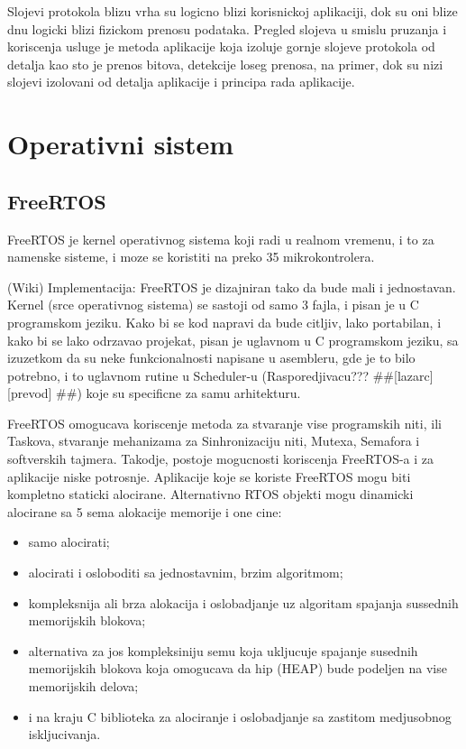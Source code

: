 \documentclass[a4paper,12pt, master]{etf}
\begin{document}
	Slojevi protokola blizu vrha su logicno blizi korisnickoj aplikaciji, dok su oni blize dnu 
	logicki blizi fizickom prenosu podataka. Pregled slojeva u smislu pruzanja i koriscenja 
	usluge je metoda aplikacije koja izoluje gornje slojeve protokola od detalja kao sto je 
	prenos bitova, detekcije loseg prenosa, na primer, dok su nizi slojevi izolovani od detalja 
	aplikacije i principa rada aplikacije.

	
	\newpage

	\chapter{Operativni sistem}

	\section{FreeRTOS}

	FreeRTOS je kernel operativnog sistema koji radi u realnom vremenu, i to za namenske 
	sisteme, i moze se koristiti na preko 35 mikrokontrolera.

	(Wiki) Implementacija:
	FreeRTOS je dizajniran tako da bude mali i jednostavan. Kernel (srce operativnog sistema) 
	se sastoji od samo 3 fajla, i pisan je u C programskom jeziku. Kako bi se kod napravi da 
	bude citljiv, lako portabilan, i kako bi se lako odrzavao projekat, pisan je uglavnom u C
	programskom jeziku, sa izuzetkom da su neke funkcionalnosti napisane u asembleru, gde je to
	bilo potrebno, i to uglavnom rutine u Scheduler-u (Rasporedjivacu??? \#\#[lazarc] [prevod]
	\#\#) koje su specificne za samu arhitekturu.

	FreeRTOS omogucava koriscenje metoda za stvaranje vise programskih niti, ili Taskova, 
	stvaranje mehanizama za Sinhronizaciju niti, Mutexa, Semafora i softverskih tajmera. 
	Takodje, postoje mogucnosti koriscenja FreeRTOS-a i za aplikacije niske potrosnje. 
	Aplikacije koje se koriste FreeRTOS mogu biti kompletno staticki alocirane. Alternativno 
	RTOS objekti mogu dinamicki	alocirane sa 5 sema alokacije memorije i one cine:
	
	\begin{itemize}
		\item samo alocirati;
		\item alocirati i osloboditi sa jednostavnim, brzim algoritmom;
		\item kompleksnija ali brza alokacija i oslobadjanje uz algoritam spajanja sussednih
		memorijskih blokova;
		\item alternativa za jos kompleksiniju semu koja ukljucuje spajanje susednih 
		memorijskih	blokova	koja omogucava da hip (HEAP) bude podeljen na vise memorijskih 
		delova;
		\item i na kraju C biblioteka za alociranje i oslobadjanje sa zastitom medjusobnog 
		iskljucivanja.
	\end{itemize}
\end{document}
